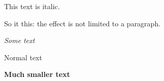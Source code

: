 \documentclass{article}
\begin{document}
	\lipsum
	
	
	{\itshape
		
		This text is italic.
		
		So it this: the effect is not limited to a paragraph.
		
	}
	
	\begin{center}
		{\itshape\large Some text\par}
		Normal text 
		{\bfseries\small Much smaller text\par}
	\end{center}
	
\end{document}
